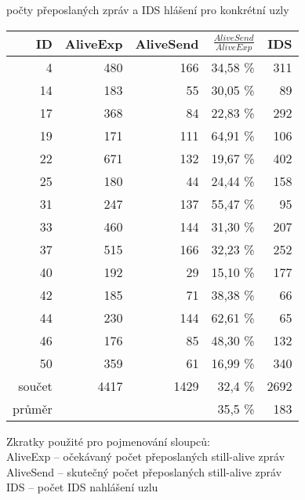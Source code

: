 \documentclass[11pt,final,twoside]{fithesis2}
\begin{document}
\begin {table}[h]
\caption {počty přeposlaných zpráv a IDS hlášení pro konkrétní uzly} \label{tab:ids} 
\begin{center}
\begin{tabular}{rrrrr}

ID  & AliveExp &  AliveSend & $\frac{AliveSend}{AliveExp}$& IDS \\
\hline
4   &        480  &        166  &        34,58 \%  &        311 \\
14  &        183  &        55   &        30,05 \%  &        89  \\
17  &        368  &        84   &        22,83 \%  &        292 \\
19  &        171  &        111  &        64,91 \%  &        106 \\
22  &        671  &        132  &        19,67 \%  &        402 \\
25  &        180  &        44   &        24,44 \%  &        158 \\
31  &        247  &        137  &        55,47 \%  &        95 \\
33  &        460  &        144  &        31,30 \%  &        207 \\
37  &        515  &        166  &        32,23 \%  &        252 \\
40  &        192  &        29   &        15,10 \%  &        177 \\
42  &        185  &        71   &        38,38 \%  &        66 \\
44  &        230  &        144  &        62,61 \%  &        65 \\
46  &        176  &        85   &        48,30 \%  &        132 \\
50  &        359  &        61   &        16,99 \%  &        340 \\
\hline
\hline
součet &        4417 &        1429 &        32,4 \%   &        2692 \\
průměr &             &             &        35,5 \%  &        183 \\
\end{tabular}
\bigskip
\caption*{Zkratky použité pro pojmenování sloupců:\\
	  AliveExp -- očekávaný počet přeposlaných still-alive zpráv \\
	  AliveSend -- skutečný počet přeposlaných still-alive zpráv \\	  
	  IDS -- počet IDS nahlášení uzlu}
\end{center}
\end {table}
\end{document}
